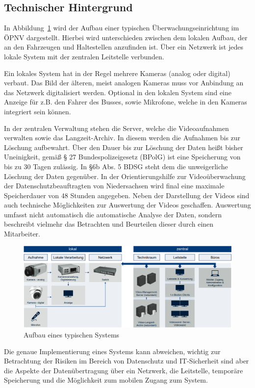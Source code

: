\newpage
\subsection{Technischer Hintergrund}
In Abbildung~\ref{fig:architektur} wird der Aufbau einer typischen Überwachungseinrichtung im ÖPNV dargestellt. Hierbei wird unterschieden zwischen dem lokalen Aufbau, der an den Fahrzeugen und Haltestellen
anzufinden ist. Über ein Netzwerk ist jedes lokale System mit der zentralen Leitstelle verbunden.

Ein lokales System hat in der Regel mehrere Kameras (analog oder digital) verbaut. Das Bild der älteren, meist analogen Kameras muss vor Anbindung an das Netzwerk digitalisiert werden.
Optional in den lokalen System sind eine Anzeige für z.B. den Fahrer des Busses, sowie Mikrofone, welche in den Kameras integriert sein können.

In der zentralen Verwaltung stehen die Server, welche die Videoaufnahmen verwalten sowie das \glqq{}Langzeit-Archiv\grqq{}. In diesem werden die Aufnahmen bis zur Löschung aufbewahrt.
Über den Dauer bis zur Löschung der Daten heißt bisher Uneinigkeit, gemäß § 27 Bundespolizeigesetz (BPolG) ist eine Speicherung von bis zu 30 Tagen zulässig. In  §6b Abs. 5 BDSG
steht dem die unweigerliche Löschung der Daten gegenüber. In der \glqq{}Orientierungshilfe zur Videoüberwachung\grqq{} der Datenschutzbeauftragten von Niedersachsen wird final eine maximale
Speicherdauer von 48 Stunden angegeben\cite{DanielaWindelband.20.April2016}. Neben der Darstellung der Videos sind auch technische Möglichkeiten zur Auswertung der Videos geschaffen.
Auswertung umfasst nicht automatisch die automatische Analyse der Daten, sondern beschreibt vielmehr das Betrachten und Beurteilen dieser durch einen Mitarbeiter.

\begin{figure}[ht]
    \begin{center}
        \includegraphics[width= 1\textwidth]{Bilder/architektur.png}
        \caption{Aufbau eines typischen Systems \cite{LandesbeauftragtefurdenDatenschutzBadenWurttemberg.2015}}
        \label{fig:architektur}
    \end{center}
\end{figure}
Die genaue Implementierung eines Systems kann abweichen, wichtig zur Betrachtung der Risiken im Bereich von Datenschutz und IT-Sicherheit
sind aber die Aspekte der Datenübertragung über ein Netzwerk, die Leitstelle, temporäre Speicherung und die Möglichkeit zum mobilen Zugang zum System.